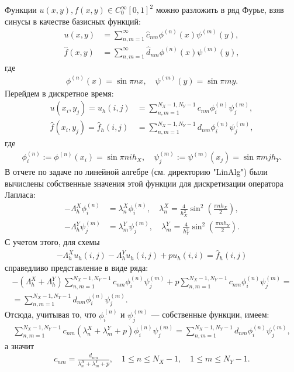 \documentclass[14pt,a4paper]{extarticle}
\newcommand{\1}{\mathbbm{1}}
\begin{document}
Функции $u(x, y), f(x, y) \in C^{\infty}_0[0, 1]^2$ можно разложить в ряд Фурье,
взяв синусы в качестве базисных функций:
\begin{align*}
    u(x, y) &= \sum_{n, m = 1}^{\infty} \hat c_{nm} \phi ^{(n)}(x) \psi ^{(m)}(y), \\
    \hat f(x, y) &= \sum_{n, m = 1}^{\infty} \hat d_{nm} \phi ^{(n)}(x) \psi ^{(m)}(y),
\end{align*}
где
\begin{align*}
    \phi ^{(n)}(x) = \sin {\pi n x}, \quad \psi ^{(m)}(y) = \sin {\pi m y}.
\end{align*}
Перейдем в дискретное время:
\begin{align*}
    u(x_i, y_j) = u_h(i, j) &= \sum_{n, m = 1}^{N_X-1, N_Y-1} c_{nm} \phi ^{(n)}_i \psi ^{(m)}_j, \\
    \hat f(x_i, y_j) = \hat f_h(i, j) &= \sum_{n, m = 1}^{N_X-1, N_Y-1} d_{nm} \phi ^{(n)}_i \psi ^{(m)}_j,
\end{align*}
где
\begin{align*}
    \phi _{i}^{(n)} := \phi ^{(n)}(x_i) = \sin {\pi n i h_X}, \quad 
    \psi _{j}^{(m)} := \psi ^{(m)}(x_j) = \sin {\pi m j h_Y}.
\end{align*}
В отчете по задаче по линейной алгебре (см. директорию "LinAlg") были вычислены собственные значения этой функции для дискретизации оператора Лапласа:
\begin{align*}
    -\Lambda _h^X \phi _{i}^{(n)} &= \lambda^X_n \phi _{i}^{(n)}, \quad 
    \lambda^X_n = \frac{4}{h_X^2} \sin ^2\left(\frac{\pi n h_X}{2}\right), \\
    -\Lambda _h^Y \psi _{j}^{(m)} &= \lambda^Y_m \psi _{j}^{(m)}, \quad 
    \lambda^Y_m = \frac{4}{h_Y^2} \sin ^2\left(\frac{\pi m h_Y}{2}\right).
\end{align*}
С учетом этого, для схемы 
\begin{align*}
    -\Lambda _h^X u_h(i, j) -\Lambda _h^Y u_h(i, j) + p u_h(i, i)= \hat f_h(i, j)
\end{align*}
справедливо представление в виде ряда:
\begin{align*}
    -\left(\Lambda _h^X + \Lambda _h^Y\right) \sum_{n, m = 1}^{N_X-1, N_Y-1} c_{nm} \phi ^{(n)}_i \psi ^{(m)}_j  
    + p \sum_{n, m = 1}^{N_X-1, N_Y-1} c_{nm} \phi ^{(n)}_i \psi ^{(m)}_j =\\
    =   \sum_{n, m = 1}^{N_X-1, N_Y-1} d_{nm} \phi ^{(n)}_i \psi ^{(m)}_j.
\end{align*}
Отсюда, учитывая то, что $\phi ^{(n)}_i$ и $\psi ^{(m)}_j$ --- собственные функции, имеем:
\begin{align*}
    \sum_{n, m = 1}^{N_X-1, N_Y-1} c_{nm} (\lambda^X_n +  \lambda^Y_m + p) \phi ^{(n)}_i \psi ^{(m)}_j  
    = \sum_{n, m = 1}^{N_X-1, N_Y-1} d_{nm} \phi ^{(n)}_i \psi ^{(m)}_j,
\end{align*}
а значит
\begin{align*}
    c_{nm} = \frac{d_{nm}}{\lambda^X_n +  \lambda^Y_m + p}, \quad 1 \leq n \leq N_X-1, \quad 1 \leq m \leq N_Y-1.
\end{align*}
\end{document}
